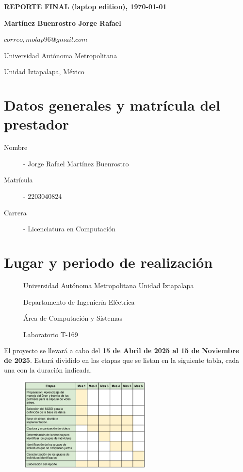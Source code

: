 \documentclass[letterpaper,11pt,twoside]{report}
\date{}
\begin{document}
	\centerline{\bf REPORTE FINAL (laptop edition), \today}
	\centerline{}
	\begin{center}
		\Large{\textsc{}}
	\end{center}
	
	\centerline{}
	\centerline{\textbf{Martínez Buenrostro Jorge Rafael}}
	\centerline{}
	
	\centerline{$correo, molap96@gmail.com$}
	
        \centerline{Universidad Aut\'onoma Metropolitana} 
	\centerline{Unidad Iztapalapa, M\'exico}
	
	\bigskip


	\section{Datos generales y matrícula del prestador}
	\begin{description}
		\item[Nombre] - Jorge Rafael Mart\'inez Buenrostro
		\item[Matr\'icula] - 2203040824
		\item[Carrera] - Licenciatura en Computación
	\end{description}


	\section{Lugar y periodo de realizaci\'on}
	\begin{description}
		\item[] Universidad Aut\'onoma Metropolitana Unidad Iztapalapa
		\item[] Departamento de Ingenier\'ia El\'ectrica
		\item[] \'Area de Computaci\'on y Sistemas
		\item[] Laboratorio T-169
	\end{description}
	\noindent El proyecto se llevar\'a a cabo del \textbf{15 de Abril de 2025 al 15 de Noviembre de 2025}. Estar\'a dividido en las etapas
	que se listan en la siguiente tabla, cada una con la duraci\'on indicada.
	\begin{figure}[H]
		\centering
		\includegraphics[width=0.6\textwidth]{img/gantt.png}
	\end{figure}
\end{document}
